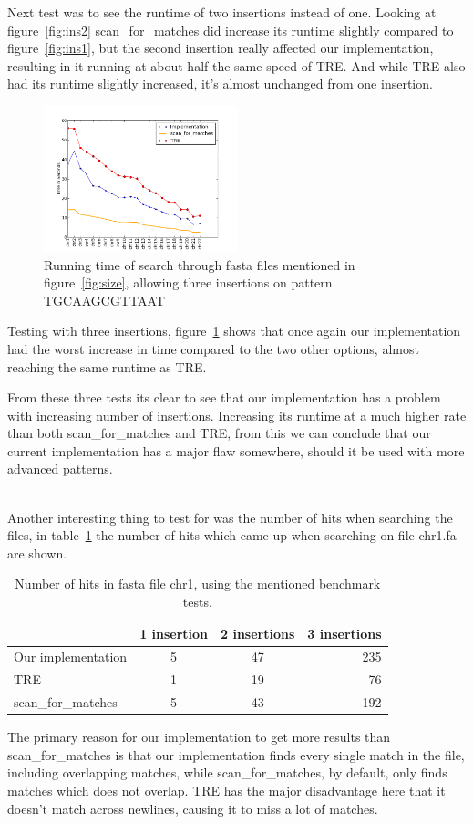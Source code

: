 Next test was to see the runtime of two insertions instead of one. Looking at figure~\ref{fig:ins2} scan\_for\_matches did increase its runtime slightly compared to figure~\ref{fig:ins1}, but the second insertion really affected our implementation, resulting in it running at about half the same speed of TRE.  And while TRE also had its runtime slightly increased, it's almost unchanged from one insertion.

\begin{figure}[h!]
\centering
\includegraphics[width=0.5\textwidth]{Benchmarking/3ins.png}
\caption{Running time of search through fasta files mentioned in figure~\ref{fig:size},  allowing three insertions on pattern TGCAAGCGTTAAT}
\label{fig:ins3}
\end{figure}
Testing with three insertions, figure~\ref{fig:ins3} shows that once again our implementation had the worst increase in time compared to the two other options, almost reaching the same runtime as TRE.


From these three tests its clear to see that our implementation has a problem with increasing number of insertions. Increasing its runtime at a much higher rate than both scan\_for\_matches and TRE, from this we can conclude that our current implementation has a major flaw somewhere, should it be used with more advanced patterns. 
\\
~

Another interesting thing to test for was the number of hits when searching the files, in table~\ref{tab:hits} the number of hits which came up when searching on file chr1.fa are shown.

\begin{table}[h!]
\centering
\begin{tabular}{ l | c c r }
& 1 insertion & 2 insertions & 3 insertions\\
\hline
Our implementation& 5 &  47 & 235 \\
TRE& 1 & 19 & 76 \\
scan\_for\_matches & 5 & 43  & 192 \\
\end{tabular}
\caption{Number of hits in fasta file chr1, using the mentioned benchmark tests.}
\label{tab:hits}
\end{table}

The primary reason for our implementation to get more results than scan\_for\_matches is that our implementation finds every single match in the file, including overlapping matches, while scan\_for\_matches, by default, only finds matches which does not overlap. TRE has the major disadvantage here that it doesn't match across newlines, causing it to miss a lot of matches.

